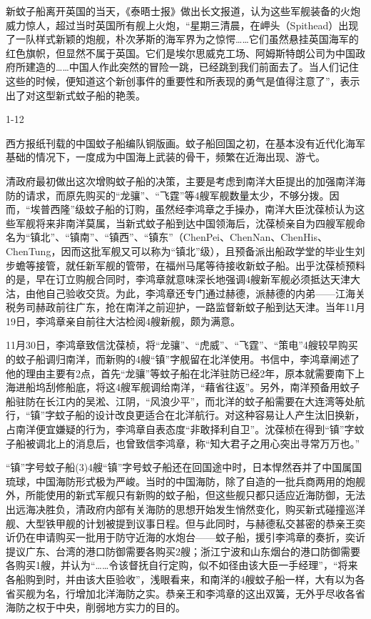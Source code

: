 \documentclass[12pt,UTF8]{ctexbook}
\begin{document}
新蚊子船离开英国的当天，《泰晤士报》做出长文报道，认为这些军舰装备的火炮威力惊人，超过当时英国所有舰上火炮，“星期三清晨，在岬头（Spithead）出现了一队样式新颖的炮舰，朴次茅斯的海军界为之惊愕……它们虽然悬挂英国海军的红色旗帜，但显然不属于英国。它们是埃尔思威克工场、阿姆斯特朗公司为中国政府所建造的……中国人作此突然的冒险一跳，已经跳到我们前面去了。当人们记住这些的时候，便知道这个新创事件的重要性和所表现的勇气是值得注意了”，表示出了对这型新式蚊子船的艳羡。

1-12

西方报纸刊载的中国蚊子船编队铜版画。蚊子船回国之初，在基本没有近代化海军基础的情况下，一度成为中国海上武装的骨干，频繁在近海出现、游弋。

清政府最初做出这次增购蚊子船的决策，主要是考虑到南洋大臣提出的加强南洋海防的请求，而原先购买的“龙骧”、“飞霆”等4艘军舰数量太少，不够分拨。因而，“埃普西隆”级蚊子船的订购，虽然经李鸿章之手操办，南洋大臣沈葆桢认为这些军舰将来非南洋莫属，当新式蚊子船到达中国领海后，沈葆桢亲自为四艘军舰命名为“镇北”、“镇南”、“镇西”、“镇东”（ChenPei、ChenNan、ChenHis、ChenTung，因而这批军舰又可以称为“镇北”级），且预备派出船政学堂的毕业生刘步蟾等接管，就任新军舰的管带，在福州马尾等待接收新蚊子船。出乎沈葆桢预料的是，早在订立购舰合同时，李鸿章就意味深长地强调4艘新军舰必须抵达天津大沽，由他自己验收交货。为此，李鸿章还专门通过赫德，派赫德的内弟——江海关税务司赫政前往广东，抢在南洋之前迎护，一路监督新蚊子船到达天津。当年11月19日，李鸿章亲自前往大沽检阅4艘新舰，颇为满意。

11月30日，李鸿章致信沈葆桢，将“龙骧”、“虎威”、“飞霆”、“策电”4艘较早购买的蚊子船调归南洋，而新购的4艘“镇”字舰留在北洋使用。书信中，李鸿章阐述了他的理由主要有2点，首先“龙骧”等蚊子船在北洋驻防已经2年，原本就需要南下上海进船坞刮修船底，将这4艘军舰调给南洋，“藉省往返”。另外，南洋预备用蚊子船驻防在长江内的吴淞、江阴，“风浪少平”，而北洋的蚊子船需要在大连湾等处航行，“镇”字蚊子船的设计改良更适合在北洋航行。对这种容易让人产生汰旧换新，占南洋便宜嫌疑的行为，李鸿章自表态度“非敢择利自卫”。沈葆桢在得到“镇”字蚊子船被调北上的消息后，也曾致信李鸿章，称“知大君子之用心突出寻常万万也。”

“镇”字号蚊子船(3)4艘“镇”字号蚊子船还在回国途中时，日本悍然吞并了中国属国琉球，中国海防形式极为严峻。当时的中国海防，除了自造的一批兵商两用的炮舰外，所能使用的新式军舰只有新购的蚊子船，但这些舰只都只适应近海防御，无法出远海决胜负，清政府内部有关海防的思想开始发生悄然变化，购买新式碰撞巡洋舰、大型铁甲舰的计划被提到议事日程。但与此同时，与赫德私交甚密的恭亲王奕䜣仍在申请购买一批用于防守近海的水炮台——蚊子船，援引李鸿章的奏折，奕䜣提议广东、台湾的港口防御需要各购买2艘；浙江宁波和山东烟台的港口防御需要各购买1艘，并认为“……令该督抚自行定购，似不如径由该大臣一手经理”，“将来各船购到时，并由该大臣验收”，浅眼看来，和南洋的4艘蚊子船一样，大有以为各省买舰为名，行增加北洋海防之实。恭亲王和李鸿章的这出双簧，无外乎尽收各省海防之权于中央，削弱地方实力的目的。
\end{document}
